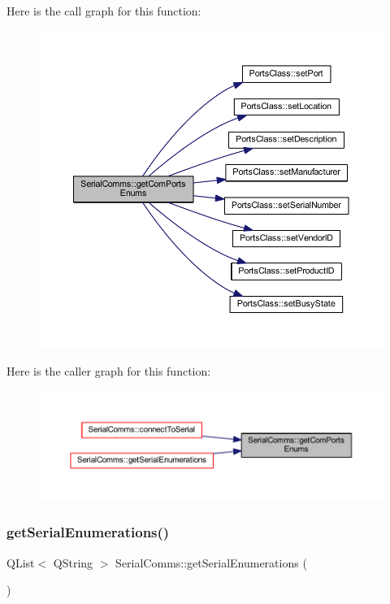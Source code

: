 Here is the call graph for this function\+:
\nopagebreak
\begin{figure}[H]
\begin{center}
\leavevmode
\includegraphics[width=350pt]{classSerialComms_acea35603a9438747302b04f0b0a81312_cgraph}
\end{center}
\end{figure}
Here is the caller graph for this function\+:
\nopagebreak
\begin{figure}[H]
\begin{center}
\leavevmode
\includegraphics[width=350pt]{classSerialComms_acea35603a9438747302b04f0b0a81312_icgraph}
\end{center}
\end{figure}
\mbox{\label{classSerialComms_ab11ec2f342fc8543e7974a843fad67dd}} 
\subsubsection{\texorpdfstring{getSerialEnumerations()}{getSerialEnumerations()}}
{\footnotesize\ttfamily Q\+List$<$ Q\+String $>$ Serial\+Comms\+::get\+Serial\+Enumerations (\begin{DoxyParamCaption}{ }\end{DoxyParamCaption})}



